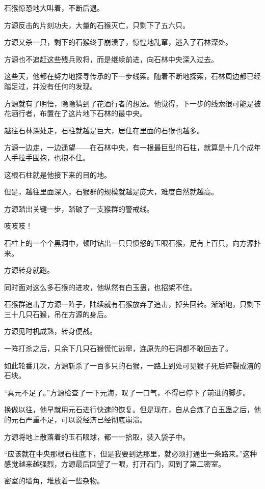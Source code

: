 \begin{this_body}
石猴惊恐地大叫着，不断后退。

方源反击的片刻功夫，大量的石猴灭亡，只剩下了五六只。

方源又杀一只，剩下的石猴终于崩溃了，惊惶地乱窜，逃入了石林深处。

方源也不追赶这些残兵败将，而是继续前进，向石林中央深入过去。

这些天，他都在努力地探寻传承的下一步线索。随着不断地探索，石林周边都已经踏足过，并没有任何的发现。

方源就有了明悟，隐隐猜到了花酒行者的想法。他觉得，下一步的线索很可能是被花酒行者，布置在了这片地下石林的最中央。

越往石林深处走，石柱就越是巨大，居住在里面的石猴也越多。

方源一边走，一边遥望——在石林中央，有一根最巨型的石柱，就算是十几个成年人手拉手围抱，也抱不住。

这根石柱就是他接下来的目的地。

但是，越往里面深入，石猴群的规模就越是庞大，难度自然就越高。

方源踏出关键一步，踏破了一支猴群的警戒线。

吱吱吱！

石柱上的一个个黑洞中，顿时钻出一只只愤怒的玉眼石猴，足有上百只，向方源扑来。

方源转身就跑。

同时面对这么多石猴的进攻，他纵然有白玉蛊，也招架不住。

石猴群追击了方源一阵子，陆续就有石猴放弃了追击，掉头回转。渐渐地，只剩下三十几只石猴，吊在方源的身后。

方源见时机成熟，转身便战。

一阵打杀之后，只余下几只石猴慌忙逃窜，连原先的石洞都不敢回去了。

如此轮番几次，方源斩杀了一百多只的石猴，一路上到处可见猴子死后碎裂成渣的石块。

“真元不足了。”方源检查了一下元海，叹了一口气，不得已停下了前进的脚步。

换做以往，他早就用元石进行快速的恢复。但是现在，自从合炼了白玉蛊之后，他的元石严重不足，可以说经济已经彻底崩溃。

方源将地上散落着的玉石眼球，都一一拾取，装入袋子中。

“应该就在中央那根石柱底下，但是我要到达那里，就必须打通出一条路来。”这种感觉越来越强烈，方源最后回望了一眼，打开石门，回到了第二密室。

密室的墙角，堆放着一些杂物。


\end{this_body}
